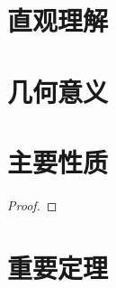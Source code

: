 \documentclass[
    lang=cn,
    color=blue,
    mode=fancy,
    thmcnt=section,
    scheme=chinese
]{elegantbook}
\begin{document}
\begin{definition}[定义名称]



\end{definition}


\section{直观理解}

\begin{note}



\end{note}


\section{几何意义}



\section{主要性质}

\begin{proposition}[性质名称]



\end{proposition}


\begin{proof}



\end{proof}


\section{重要定理}

\begin{theorem}[定理名称]



\end{theorem}
\end{document}
